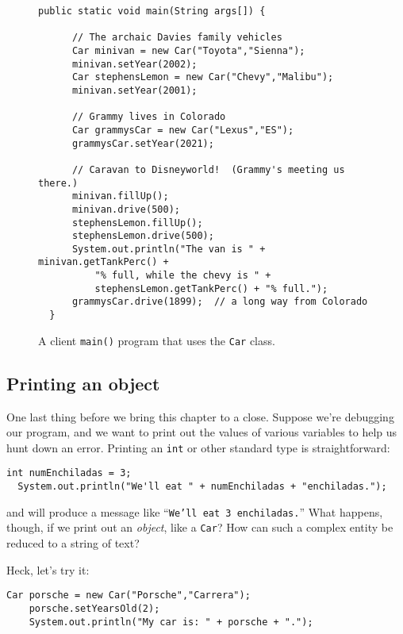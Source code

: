 \begin{figure}[h]
\centering
\begin{Verbatim}[samepage=true,fontsize=\footnotesize,frame=single]
  public static void main(String args[]) {
  
      // The archaic Davies family vehicles
      Car minivan = new Car("Toyota","Sienna");
      minivan.setYear(2002);
      Car stephensLemon = new Car("Chevy","Malibu");
      minivan.setYear(2001);
  
      // Grammy lives in Colorado
      Car grammysCar = new Car("Lexus","ES");
      grammysCar.setYear(2021);
  
      // Caravan to Disneyworld!  (Grammy's meeting us there.)
      minivan.fillUp();
      minivan.drive(500);
      stephensLemon.fillUp();
      stephensLemon.drive(500);
      System.out.println("The van is " + minivan.getTankPerc() + 
          "% full, while the chevy is " +
          stephensLemon.getTankPerc() + "% full.");
      grammysCar.drive(1899);  // a long way from Colorado
  }
\end{Verbatim}
\caption{A client \texttt{main()} program that uses the \texttt{Car} class.}
\label{fig:wholeNewWorld}
\end{figure}


\subsection{Printing an object}

One last thing before we bring this chapter to a close. Suppose we're
debugging our program, and we want to print out the values of various
variables to help us hunt down an error. Printing an \texttt{int} or other
standard type is straightforward:

\begin{Verbatim}[samepage=true,fontsize=\scriptsize,frame=single]
  int numEnchiladas = 3;
  System.out.println("We'll eat " + numEnchiladas + "enchiladas.");
\end{Verbatim}

and will produce a message like ``\texttt{We'll eat 3 enchiladas.}'' What
happens, though, if we print out an \textit{object}, like a \texttt{Car}? How
can such a complex entity be reduced to a string of text?

Heck, let's try it:

\begin{Verbatim}[samepage=true,fontsize=\scriptsize,frame=single]
    Car porsche = new Car("Porsche","Carrera");
    porsche.setYearsOld(2);
    System.out.println("My car is: " + porsche + ".");
\end{Verbatim}

